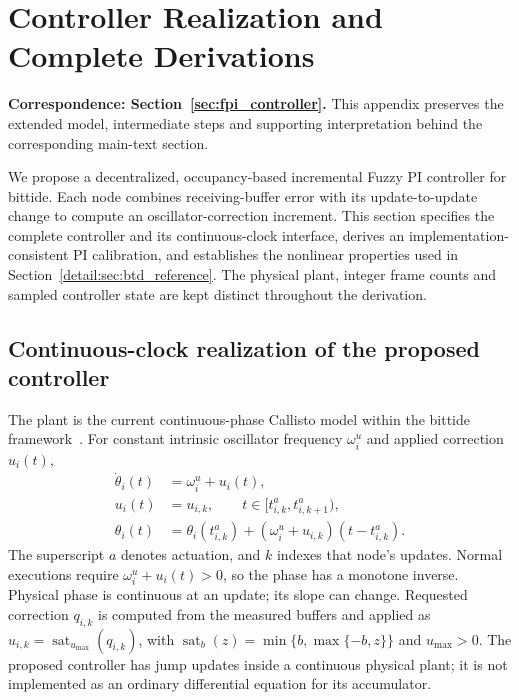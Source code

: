 \section{Controller Realization and Complete Derivations}
\label{app:controller}
\noindent\textbf{Correspondence: Section~\ref{sec:fpi_controller}.} This appendix preserves the extended model, intermediate steps and supporting interpretation behind the corresponding main-text section.


\label{detail:sec:fpi_controller}
We propose a decentralized, occupancy-based incremental Fuzzy PI controller
for bittide. Each node combines receiving-buffer error with its
update-to-update change to compute an oscillator-correction increment.
This section specifies the complete controller and its continuous-clock
interface, derives an implementation-consistent PI calibration, and
establishes the nonlinear properties used in
Section~\ref{detail:sec:btd_reference}. The physical plant, integer frame counts
and sampled controller state are kept distinct throughout the derivation.

\subsection{Continuous-clock realization of the proposed controller}

\label{detail:subsec:fpi_laws}
The plant is the current continuous-phase Callisto model within the bittide
framework~\cite{lall2024logicalSynchrony}. For constant
intrinsic oscillator frequency $\omega_i^u$ and applied correction $u_i(t)$,
\begin{align}
 \dot\theta_i(t)&=\omega_i^u+u_i(t),\nonumber\\
 u_i(t)&=u_{i,k},\qquad t\in[t^a_{i,k},t^a_{i,k+1}),\nonumber\\
 \theta_i(t)&=\theta_i(t^a_{i,k})+
       (\omega_i^u+u_{i,k})(t-t^a_{i,k}).
 \label{detail:eq:fpi_continuous_plant}
\end{align}
The superscript $a$ denotes actuation, and $k$ indexes that node's updates.
Normal executions require $\omega_i^u+u_i(t)>0$, so the phase has a
monotone inverse. Physical phase is continuous at an update; its slope can change. Requested
correction $q_{i,k}$ is computed from the measured buffers and applied as
$u_{i,k}=\operatorname{sat}_{u_{\max}}(q_{i,k})$, with
$\operatorname{sat}_b(z)=\min\{b,\max\{-b,z\}\}$ and $u_{\max}>0$.
The proposed controller has jump updates inside a continuous physical plant;
it is not implemented as an ordinary differential equation for its accumulator.

